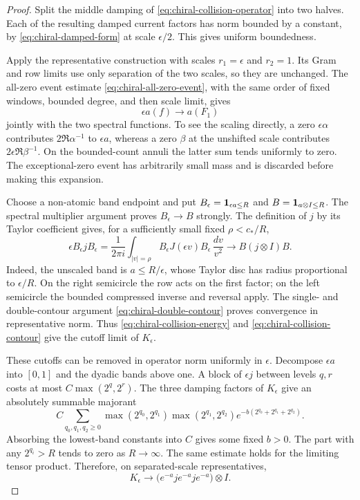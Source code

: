 \begin{proof}
Split the middle damping of \eqref{eq:chiral-collision-operator} into
two halves. Each of the resulting damped current factors has norm bounded
by a constant, by \eqref{eq:chiral-damped-form} at scale $\epsilon/2$.
This gives uniform boundedness.

Apply the representative construction with scales $r_1=\epsilon$ and
$r_2=1$. Its Gram and row limits use only separation of the two scales,
so they are unchanged. The all-zero event estimate
\eqref{eq:chiral-all-zero-event}, with the same order of fixed windows,
bounded degree, and then scale limit, gives
\begin{equation}\label{eq:chiral-collision-energy}
                     \epsilon a(f)\longrightarrow a(F_1)
\end{equation}
jointly with the two spectral functions. To see the scaling directly,
a zero $\epsilon\alpha$ contributes $2\Re\alpha^{-1}$ to $\epsilon a$,
whereas a zero $\beta$ at the unshifted scale contributes
$2\epsilon\Re\beta^{-1}$. On the bounded-count annuli the latter
sum tends uniformly to zero. The exceptional-zero event has arbitrarily
small mass and is discarded before making this expansion.

Choose a non-atomic band endpoint and put
$B_\epsilon=\mathbf1_{\epsilon a\le R}$ and
$B=\mathbf1_{a\otimes I\le R}$. The spectral multiplier argument proves
$B_\epsilon\to B$ strongly. The definition of $j$ by its Taylor
coefficient gives, for a sufficiently small fixed $\rho<c_*/R$,
\begin{equation}\label{eq:chiral-collision-contour}
 \epsilon B_\epsilon jB_\epsilon
   =\frac1{2\pi i}\int_{|v|=\rho}
             B_\epsilon J(\epsilon v)B_\epsilon\,\frac{dv}{v^2}
   \longrightarrow B(j\otimes I)B.
\end{equation}
Indeed, the unscaled band is $a\le R/\epsilon$, whose Taylor disc
has radius proportional to $\epsilon/R$. On the right semicircle
the row acts on the first factor; on the left semicircle the bounded
compressed inverse and reversal apply. The single- and double-contour
argument \eqref{eq:chiral-double-contour} proves convergence in
representative norm. Thus \eqref{eq:chiral-collision-energy} and
\eqref{eq:chiral-collision-contour} give the cutoff limit of
$K_\epsilon$.

These cutoffs can be removed in operator norm uniformly in $\epsilon$.
Decompose $\epsilon a$ into $[0,1]$ and the dyadic bands above one.
A block of $\epsilon j$ between levels $q,r$ costs at most
$C\max(2^q,2^r)$. The three damping factors of $K_\epsilon$ give an
absolutely summable majorant
\[
 C\sum_{q_0,q_1,q_2\ge0}
   \max(2^{q_0},2^{q_1})\max(2^{q_1},2^{q_2})
                       e^{-b(2^{q_0}+2^{q_1}+2^{q_2})}.
\]
Absorbing the lowest-band constants into $C$ gives some fixed $b>0$.
The part with any $2^{q_i}>R$ tends to zero as $R\to\infty$.
The same estimate holds for the limiting tensor product. Therefore,
on separated-scale representatives,
\[
 K_\epsilon\longrightarrow
           \bigl(e^{-a}je^{-a}je^{-a}\bigr)\otimes I.
\]


\end{proof}
